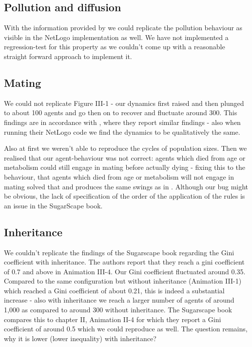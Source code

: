 \subsection{Pollution and diffusion}
With the information provided by \cite{weaver_replicating_2009} we could replicate the pollution behaviour as visible in the NetLogo implementation as well. We have not implemented a regression-test for this property as we couldn't come up with a reasonable straight forward approach to implement it.



\subsection{Mating}
We could not replicate Figure III-1 - our dynamics first raised and then plunged to about 100 agents and go then on to recover and fluctuate around 300. This findings are in accordance with \cite{weaver_replicating_2009}, where they report similar findings - also when running their NetLogo code we find the dynamics to be qualitatively the same.

Also at first we weren't able to reproduce the cycles of population sizes. Then we realised that our agent-behaviour was not correct: agents which died from age or metabolism could still engage in mating before actually dying - fixing this to the behaviour, that agents which died from age or metabolism will not engage in mating solved that and produces the same swings as in \cite{weaver_replicating_2009}. Although our bug might be obvious, the lack of specification of the order of the application of the rules is an issue in the SugarScape book.

\subsection{Inheritance}
We couldn't replicate the findings of the Sugarscape book regarding the Gini coefficient with inheritance. The authors report that they reach a gini coefficient of 0.7 and above in Animation III-4. Our Gini coefficient fluctuated around 0.35. Compared to the same configuration but without inheritance (Animation III-1) which reached a Gini coefficient of about 0.21, this is indeed a substantial increase - also with inheritance we reach a larger number of agents of around 1,000 as compared to around 300 without inheritance.
The Sugarscape book compares this to chapter II, Animation II-4 for which they report a Gini coefficient of around 0.5 which we could reproduce as well. The question remains, why it is lower (lower inequality) with inheritance?

